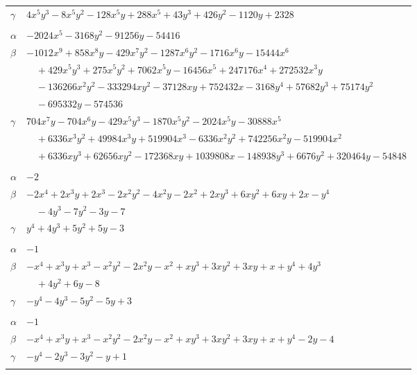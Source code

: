 \documentclass[11pt]{article}
\begin{document}
\begin{longtable}{@{}ll@{}}
$\gamma$ & $4x^{5}y^{3}-8x^{5}y^{2}-128x^{5}y+288x^{5}+43y^{3}+426y^{2}-1120y+2328$\\
\addlinespace[3pt]
\multicolumn{2}{@{}l}{$\{i,j\}=\{6,38\}$, $k_{ij}=2^{4}\cdot 3^{3}$}\\
$\alpha$ & $-2024x^{5}-3168y^{2}-91256y-54416$\\
$\beta$ & $-1012x^{9}+858x^{8}y-429x^{7}y^{2}-1287x^{6}y^{2}-1716x^{6}y-15444x^{6}$\\
 & $\quad +429x^{5}y^{3}+275x^{5}y^{2}+7062x^{5}y-16456x^{5}+247176x^{4}+272532x^{3}y$\\
 & $\quad -136266x^{2}y^{2}-333294xy^{2}-37128xy+752432x-3168y^{4}+57682y^{3}+75174y^{2}$\\
 & $\quad -695332y-574536$\\
$\gamma$ & $704x^{7}y-704x^{6}y-429x^{5}y^{3}-1870x^{5}y^{2}-2024x^{5}y-30888x^{5}$\\
 & $\quad +6336x^{3}y^{2}+49984x^{3}y+519904x^{3}-6336x^{2}y^{2}+742256x^{2}y-519904x^{2}$\\
 & $\quad +6336xy^{3}+62656xy^{2}-172368xy+1039808x-148938y^{3}+6676y^{2}+320464y-54848$\\
\addlinespace[3pt]
\multicolumn{2}{@{}l}{$\{i,j\}=\{7,10\}$, $k_{ij}=2^{3}$}\\
$\alpha$ & $-2$\\
$\beta$ & $-2x^{4}+2x^{3}y+2x^{3}-2x^{2}y^{2}-4x^{2}y-2x^{2}+2xy^{3}+6xy^{2}+6xy+2x-y^{4}$\\
 & $\quad -4y^{3}-7y^{2}-3y-7$\\
$\gamma$ & $y^{4}+4y^{3}+5y^{2}+5y-3$\\
\addlinespace[3pt]
\multicolumn{2}{@{}l}{$\{i,j\}=\{7,11\}$, $k_{ij}=2^{2}$}\\
$\alpha$ & $-1$\\
$\beta$ & $-x^{4}+x^{3}y+x^{3}-x^{2}y^{2}-2x^{2}y-x^{2}+xy^{3}+3xy^{2}+3xy+x+y^{4}+4y^{3}$\\
 & $\quad +4y^{2}+6y-8$\\
$\gamma$ & $-y^{4}-4y^{3}-5y^{2}-5y+3$\\
\addlinespace[3pt]
\multicolumn{2}{@{}l}{$\{i,j\}=\{7,12\}$, $k_{ij}=2^{2}$}\\
$\alpha$ & $-1$\\
$\beta$ & $-x^{4}+x^{3}y+x^{3}-x^{2}y^{2}-2x^{2}y-x^{2}+xy^{3}+3xy^{2}+3xy+x+y^{4}-2y-4$\\
$\gamma$ & $-y^{4}-2y^{3}-3y^{2}-y+1$\\
\addlinespace[3pt]
\multicolumn{2}{@{}l}{$\{i,j\}=\{7,25\}$, $k_{ij}=2^{4}$}\\

\end{longtable}
\end{document}
